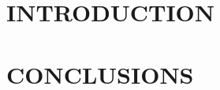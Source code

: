 \documentclass[12pt,a4paper]{article}
\begin{document}
\maketitle


\newpage

\tableofcontents
\listoffigures
\listoftables
\newpage
{}

\section{INTRODUCTION \hrulefill}

\newpage


\section{CONCLUSIONS \hrulefill}

\newpage

\appendix
\setcounter{secnumdepth}{1}
\begin{subappendices}
  
\end{subappendices}

\newpage
\begin{thebibliography}{9}
  
\end{thebibliography}


\end{document}
